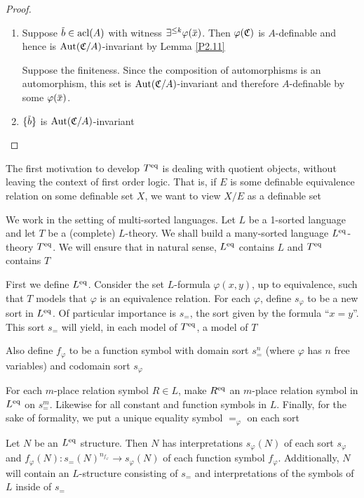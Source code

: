 \documentclass[11pt]{article}
\begin{document}
\begin{proof}
\begin{enumerate}
\item Suppose \(\barb\in\acl(A)\) with witness \(\exists^{\le k}\varphi(\barx)\). Then \(\varphi(\mathfrak{C})\) is \(A\)-definable
and hence is \(\operatorname{\text{Aut}}(\mathfrak{C}/A)\)-invariant by Lemma \ref{P2.11}

Suppose the finiteness. Since the composition of automorphisms is an automorphism, this set
is \(\operatorname{\text{Aut}}(\mathfrak{C}/A)\)-invariant and therefore \(A\)-definable by some \(\varphi(\barx)\).

\item \(\{\barb\}\) is \(\operatorname{\text{Aut}}(\mathfrak{C}/A)\)-invariant
\end{enumerate}
\end{proof}

The first motivation to develop \(T^{\operatorname{eq}}\) is dealing with quotient objects, without leaving
the context of first order logic. That is, if \(E\) is some definable equivalence relation on
some definable set \(X\), we want to view \(X/E\) as a definable set

We work in the setting of multi-sorted languages. Let \(L\) be a 1-sorted language and let \(T\)
be a (complete) \(L\)-theory. We shall build a many-sorted
language \(L^{\operatorname{eq}}\)-theory \(T^{\operatorname{eq}}\). We will ensure that in natural sense, \(L^{\operatorname{eq}}\)
contains \(L\) and \(T^{\operatorname{eq}}\) contains \(T\)

First we define \(L^{\operatorname{eq}}\). Consider the set \(L\)-formula \(\varphi(x,y)\), up to equivalence, such
that \(T\) models that \(\varphi\) is an equivalence relation. For each \(\varphi\), define \(s_\varphi\) to be a new sort
in \(L^{\operatorname{eq}}\). Of particular importance is \(s_=\), the sort given by the formula ``\(x=y\)''.
This sort \(s_=\) will yield, in each model of \(T^{\operatorname{eq}}\), a model of \(T\)

Also define \(f_\varphi\) to be a function symbol with domain sort \(s^n_=\) (where \(\varphi\) has \(n\) free
variables) and codomain sort \(s_\varphi\)

For each \(m\)-place relation symbol \(R\in L\), make \(R^{\operatorname{eq}}\) an \(m\)-place relation symbol
in \(L^{\operatorname{eq}}\) on \(s_=^m\). Likewise for all constant and function symbols in \(L\). Finally, for
the sake of formality, we put a unique equality symbol \(=_\varphi\) on each sort

\begin{remark}
Let \(N\) be an \(L^{\operatorname{eq}}\) structure. Then \(N\) has interpretations \(s_\varphi(N)\) of each
sort \(s_\varphi\) and \(f_\varphi(N):s_=(N)^{n_{f_\varphi}}\to s_\varphi(N)\) of each function symbol \(f_\varphi\).
Additionally, \(N\) will contain an \(L\)-structure consisting of \(s_=\) and interpretations of
the symbols of \(L\) inside of \(s_=\)
\end{remark}
\end{document}

